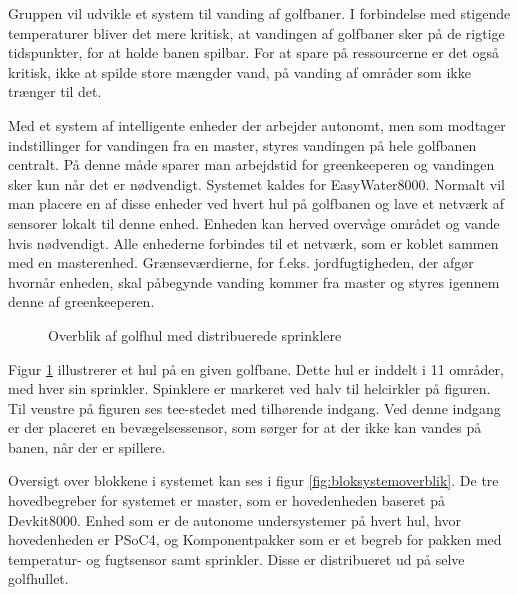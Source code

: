 Gruppen vil udvikle et system til vanding af golfbaner. I forbindelse med stigende temperaturer bliver det mere kritisk, at vandingen af golfbaner sker på de rigtige tidspunkter, for at holde banen spilbar. For at spare på ressourcerne er det også kritisk, ikke at spilde store mængder vand, på vanding af områder som ikke trænger til det. 

Med et system af intelligente enheder der arbejder autonomt, men som modtager indstillinger for vandingen fra en master, styres vandingen på hele golfbanen centralt. På denne måde sparer man arbejdstid for greenkeeperen og vandingen sker kun når det er nødvendigt. Systemet kaldes for EasyWater8000. 
Normalt vil man placere en af disse enheder ved hvert hul på golfbanen og lave et netværk af sensorer lokalt til denne enhed. Enheden kan herved overvåge området og vande hvis nødvendigt. Alle enhederne forbindes til et netværk, som er koblet sammen med en masterenhed. Grænseværdierne, for f.eks. jordfugtigheden, der afgør hvornår enheden, skal påbegynde vanding kommer fra master og styres igennem denne af greenkeeperen. 


\begin{figure}[ht] \centering
{}
\caption{Overblik af golfhul med distribuerede sprinklere}
\label{fig:systemoverblik}
\end{figure}

Figur \ref{fig:systemoverblik} illustrerer et hul på en given golfbane. Dette hul er inddelt i 11 områder, med hver sin sprinkler. Spinklere er markeret ved halv til helcirkler på figuren. Til venstre på figuren ses tee-stedet med tilhørende indgang. Ved denne indgang er der placeret en bevægelsessensor, som sørger for at der ikke kan vandes på banen, når der er spillere. 

Oversigt over blokkene i systemet kan ses i figur \ref{fig:bloksystemoverblik}. De tre hovedbegreber for systemet er master, som er hovedenheden baseret på Devkit8000. Enhed som er de autonome undersystemer på hvert hul, hvor hovedenheden er PSoC4, og Komponentpakker som er et begreb for pakken med temperatur- og fugtsensor samt sprinkler. Disse er distribueret ud på selve golfhullet.

